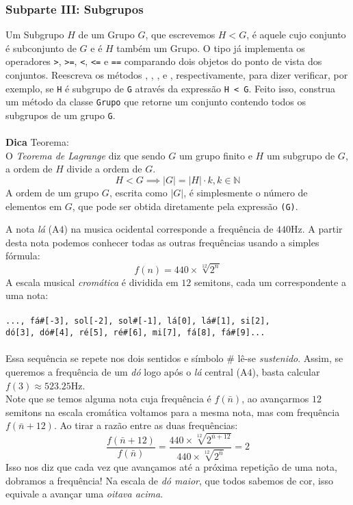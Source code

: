 \documentclass[12pt]{article}
\begin{document}
	\subsubsection{Subparte III: Subgrupos}
	Um Subgrupo $H$ de um Grupo $G$, que escrevemos $H < G$, é aquele cujo conjunto é subconjunto de $G$ e é $H$ também um Grupo. O tipo  já implementa os operadores \texttt{>}, \texttt{>=}, \texttt{<}, \texttt{<=} e \texttt{==} comparando dois objetos do ponto de vista dos conjuntos. Reescreva os métodos , , ,  e , respectivamente, para dizer verificar, por exemplo, se \texttt{H} é subgrupo de \texttt{G} através da expressão \texttt{H < G}.
	Feito isso, construa um método da classe \texttt{Grupo} que retorne um conjunto contendo todos os subgrupos de um grupo \texttt{G}.\\
	\\
	\textbf{Dica} Teorema: \\
	O \emph{Teorema de Lagrange} diz que sendo $G$ um grupo finito e $H$ um subgrupo de $G$, a ordem de $H$ divide a ordem de $G$.
	\[H < G \implies |G| = |H| \cdot k, k \in \mathbb{N}\]
	A ordem de um grupo $G$, escrita como $|G|$, é simplesmente o número de elementos em $G$, que pode ser obtida diretamente pela expressão \texttt{(G)}.
	
	\pagebreak
	
	A nota \emph{lá} (A$4$) na musica ocidental corresponde a frequência de $440\text{Hz}$. A partir desta nota podemos conhecer todas as outras frequências usando a simples fórmula:
	\[f(n) = 440 \times \sqrt[12]{2^{n}}\]
	A escala musical \emph{cromática} é dividida em $12$ semitons, cada um correspondente a uma nota:\\
	\\
	\texttt{..., fá\#[-3], sol[-2], sol\#[-1], lá[0], lá\#[1], si[2],}\\ \texttt{dó[3], dó\#[4], ré[5], ré\#[6], mi[7], fá[8], fá\#[9]...}\\
	\\
	Essa sequência se repete nos dois sentidos e símbolo \# lê-se \emph{sustenido}. Assim, se queremos a frequência de um \emph{dó} logo após o \emph{lá} central (A$4$), basta calcular $f(3) \approx 523.25\text{Hz}$.\\
	Note que se temos alguma nota cuja frequência é $f(\bar{n})$, ao avançarmos $12$ semitons na escala cromática voltamos para a mesma nota, mas com frequência $f(\bar{n} + 12)$. Ao tirar a razão entre as duas frequências:
	\[\frac{f(\bar{n} + 12)}{f(\bar{n})} = \frac{440 \times \sqrt[12]{2^{\bar{n} + 12}}}{440 \times \sqrt[12]{2^{\bar{n}}}} = 2\]
	Isso nos diz que cada vez que avançamos até a próxima repetição de uma nota, dobramos a frequência! Na escala de \emph{dó maior}, que todos sabemos de cor, isso equivale a avançar uma \emph{oitava acima}.
	
\end{document}

